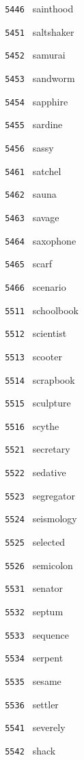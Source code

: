 \documentclass[11pt]{article}
\begin{document}
\begin{multicols}{6}
\noindent \texttt{ 5446 } sainthood  \par
\noindent \texttt{ 5451 } saltshaker  \par
\noindent \texttt{ 5452 } samurai  \par
\noindent \texttt{ 5453 } sandworm  \par
\noindent \texttt{ 5454 } sapphire  \par
\noindent \texttt{ 5455 } sardine  \par
\noindent \texttt{ 5456 } sassy  \par
\noindent \texttt{ 5461 } satchel  \par
\noindent \texttt{ 5462 } sauna  \par
\noindent \texttt{ 5463 } savage  \par
\noindent \texttt{ 5464 } saxophone  \par
\noindent \texttt{ 5465 } scarf  \par
\noindent \texttt{ 5466 } scenario  \par
\noindent \texttt{ 5511 } schoolbook  \par
\noindent \texttt{ 5512 } scientist  \par
\noindent \texttt{ 5513 } scooter  \par
\noindent \texttt{ 5514 } scrapbook  \par
\noindent \texttt{ 5515 } sculpture  \par
\noindent \texttt{ 5516 } scythe  \par
\noindent \texttt{ 5521 } secretary  \par
\noindent \texttt{ 5522 } sedative  \par
\noindent \texttt{ 5523 } segregator  \par
\noindent \texttt{ 5524 } seismology  \par
\noindent \texttt{ 5525 } selected  \par
\noindent \texttt{ 5526 } semicolon  \par
\noindent \texttt{ 5531 } senator  \par
\noindent \texttt{ 5532 } septum  \par
\noindent \texttt{ 5533 } sequence  \par
\noindent \texttt{ 5534 } serpent  \par
\noindent \texttt{ 5535 } sesame  \par
\noindent \texttt{ 5536 } settler  \par
\noindent \texttt{ 5541 } severely  \par
\noindent \texttt{ 5542 } shack  \par

\end{multicols}
\end{document}
